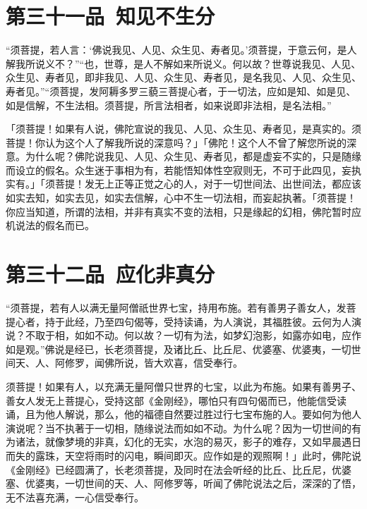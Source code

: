 \documentclass[12pt,twoside,openany]{book}
\newcommand{\kai}[1]{{\CJKfamily{kai}#1}}
\begin{document}
\chapter{第三十一品\ 知见不生分}
\begin{pinyinscope}
“须菩提，若人言：‘佛说我见、人见、众生见、寿者见。’须菩提，于意云何，是人解我所说义不？”“也，世尊，是人不解如来所说义。何以故？世尊说我见、人见、众生见、寿者见，即非我见、人见、众生见、寿者见，是名我见、人见、众生见、寿者见。”“须菩提，发阿耨多罗三藐三菩提心者，于一切法，应如是知、如是见、如是信解，不生法相。须菩提，所言法相者，如来说即非法相，是名法相。”
\end{pinyinscope}

\kai{「须菩提！如果有人说，佛陀宣说的我见、人见、众生见、寿者见，是真实的。须菩提！你认为这个人了解我所说的深意吗？」「佛陀！这个人不曾了解您所说的深意。为什么呢？佛陀说我见、人见、众生见、寿者见，都是虚妄不实的，只是随缘而设立的假名。众生迷于事相为有，若能悟知体性空寂则无，不可于此四见，妄执实有。」「须菩提！发无上正等正觉之心的人，对于一切世间法、出世间法，都应该如实去知，如实去见，如实去信解，心中不生一切法相，而妄起执著。「须菩提！你应当知道，所谓的法相，并非有真实不变的法相，只是缘起的幻相，佛陀暂时应机说法的假名而已。}

\chapter{第三十二品\ 应化非真分}
\begin{pinyinscope}
“须菩提，若有人以满无量阿僧祇世界七宝，持用布施。若有善男子善女人，发菩提心者，持于此经，乃至四句偈等，受持读诵，为人演说，其福胜彼。云何为人演说？不取于相，如如不动。何以故？{\color{red}一切有为法，如梦幻泡影，如露亦如电，应作如是观。}”佛说是经已，长老须菩提，及诸比丘、比丘尼、优婆塞、优婆夷，一切世间天、人、阿修罗，闻佛所说，皆大欢喜，信受奉行。
\end{pinyinscope}

\kai{须菩提！如果有人，以充满无量阿僧只世界的七宝，以此为布施。如果有善男子、善女人发无上菩提心，受持这部《金刚经》，哪怕只有四句偈而已，他能信受读诵，且为他人解说，那么，他的福德自然要过胜过行七宝布施的人。要如何为他人演说呢？当不执著于一切相，随缘说法而如如不动。为什么呢？因为一切世间的有为诸法，就像梦境的非真，幻化的无实，水泡的易灭，影子的难存，又如早晨遇日而失的露珠，天空将雨时的闪电，瞬间即灭。应作如是的观照啊！」此时，佛陀说《金刚经》已经圆满了，长老须菩提，及同时在法会听经的比丘、比丘尼，优婆塞、优婆夷，一切世间的天、人、阿修罗等，听闻了佛陀说法之后，深深的了悟，无不法喜充满，一心信受奉行。}
\end{document}
